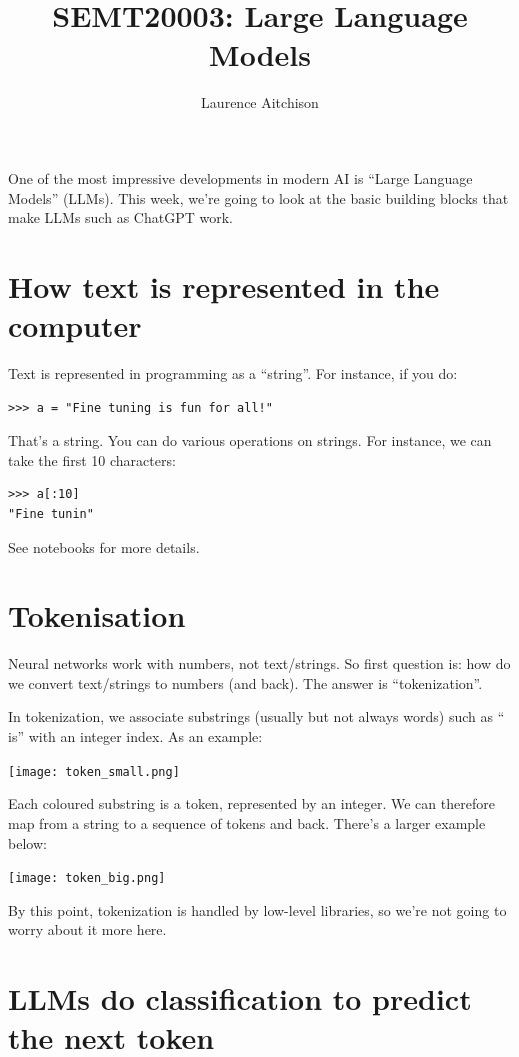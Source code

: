 \documentclass{article}
\title{SEMT20003: Large Language Models}
\author{Laurence Aitchison}
\date{}
\begin{document}
\maketitle

One of the most impressive developments in modern AI is ``Large Language Models'' (LLMs).
This week, we're going to look at the basic building blocks that make LLMs such as ChatGPT work.

\section{How text is represented in the computer}

Text is represented in programming as a ``string''.
For instance, if you do:
\begin{verbatim}
>>> a = "Fine tuning is fun for all!"
\end{verbatim}
That's a string.
You can do various operations on strings.  For instance, we can take the first 10 characters:
\begin{verbatim}
>>> a[:10]
"Fine tunin"
\end{verbatim}
See notebooks for more details.

\section{Tokenisation}

Neural networks work with numbers, not text/strings.
So first question is: how do we convert text/strings to numbers (and back).
The answer is ``tokenization''.

In tokenization, we associate substrings (usually but not always words) such as `` is'' with an integer index.
As an example:
\begin{center}
  \texttt{[image: token\_small.png]}
\end{center}
Each coloured substring is a token, represented by an integer.
We can therefore map from a string to a sequence of tokens and back.
There's a larger example below:
\begin{center}
  \texttt{[image: token\_big.png]}
\end{center}
By this point, tokenization is handled by low-level libraries, so we're not going to worry about it more here.

\section{LLMs do classification to predict the next token}
\end{document}
